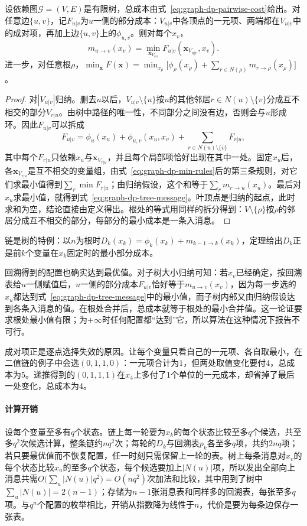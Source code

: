 \begin{theorem}[树上消息的含义]
\label{thm:graph-dp-tree-message}
设依赖图$\mathcal G=(V,E)$是有限树，总成本由式~\eqref{eq:graph-dp-pairwise-cost}给出。对任意边$\{u,v\}$，记$F_{u|v}$为$u$一侧的部分成本：$V_{u|v}$中各顶点的一元项、两端都在$V_{u|v}$中的成对项，再加上边$\{u,v\}$上的$\phi_{u,v}$。则对每个$x_v$，
\[
m_{u\to v}(x_v)=\min_{\bm x_{V_{u|v}}}F_{u|v}(\bm x_{V_{u|v}},x_v).
\]
进一步，对任意根$\rho$，$\min_{\bm x}F(\bm x)=\min_{x_\rho}\bigl[\phi_\rho(x_\rho)+\sum_{r\in N(\rho)}m_{r\to\rho}(x_\rho)\bigr]$。
\end{theorem}

\begin{proof}
对$|V_{u|v}|$归纳。删去$u$以后，$V_{u|v}\setminus\{u\}$按$u$的其他邻居$r\in N(u)\setminus\{v\}$分成互不相交的部分$V_{r|u}$。由树中路径的唯一性，不同部分之间没有边，否则会与$u$形成环。因此$F_{u|v}$可以拆成
\[
F_{u|v}=\phi_u(x_u)+\phi_{u,v}(x_u,x_v)+\sum_{r\in N(u)\setminus\{v\}}F_{r|u},
\]
其中每个$F_{r|u}$只依赖$x_u$与$\bm x_{V_{r|u}}$，并且每个局部项恰好出现在其中一处。固定$x_u$后，各$\bm x_{V_{r|u}}$是互不相交的变量组，由式~\eqref{eq:graph-dp-min-rules}后的第三条规则，对它们求最小值得到$\sum_r\min F_{r|u}$；由归纳假设，这个和等于$\sum_r m_{r\to u}(x_u)$。最后对$x_u$求最小值，就得到式~\eqref{eq:graph-dp-tree-message}。叶顶点是归纳的起点，此时求和为空，结论直接由定义得出。根处的等式用同样的拆分得到：$V\setminus\{\rho\}$按$\rho$的邻居分成互不相交的部分，每部分的最小成本是一条入消息。
\end{proof}

链是树的特例：以$n$为根时$D_k(x_k)=\phi_k(x_k)+m_{k-1\to k}(x_k)$，定理给出$D_k$正是前$k$个变量在$x_k$固定时的最小部分成本。

回溯得到的配置也确实达到最优值。对子树大小归纳可知：若$x_v$已经确定，按回溯表给$u$一侧赋值后，$u$一侧的部分成本$F_{u|v}$恰好等于$m_{u\to v}(x_v)$，因为每一步选的$x_u$都达到式~\eqref{eq:graph-dp-tree-message}中的最小值，而子树内部又由归纳假设达到各条入消息的值。在根处合并后，总成本就等于根处的最小合并值。这一论证要求根处最小值有限；为$+\infty$时任何配置都“达到”它，所以算法在这种情况下报告不可行。

成对项正是逐点选择失效的原因。让每个变量只看自己的一元项、各自取最小，在二值链的例子中会选$(0,1,1,0)$：一元项合计为$1$，但两处取值变化要付$4$，总成本为$5$。递推得到的$(0,1,1,1)$在$x_4$上多付了$1$个单位的一元成本，却省掉了最后一处变化，总成本为$4$。

\paragraph{计算开销}
设每个变量至多有$q$个状态。链上每一轮要为$x_k$的每个状态比较至多$q$个候选，共至多$q^2$次候选计算，整条链约$nq^2$次；每轮的$D_k$与回溯表$p_k$各至多$q$项，共约$2nq$项；若只要最优值而不恢复配置，任一时刻只需保留上一轮的表。树上每条消息对$x_v$的每个状态比较$x_u$的至多$q$个状态，每个候选要加上$|N(u)|$项，所以发出全部向上消息共需$O\bigl(\sum_u|N(u)|q^2\bigr)=O(nq^2)$次加法和比较，其中用到了树中$\sum_u|N(u)|=2(n-1)$；存储为$n-1$张消息表和同样多的回溯表，每张至多$q$项。与$q^n$个配置的枚举相比，开销从指数降为线性于$n$，代价是要为每条边保存一张表。

